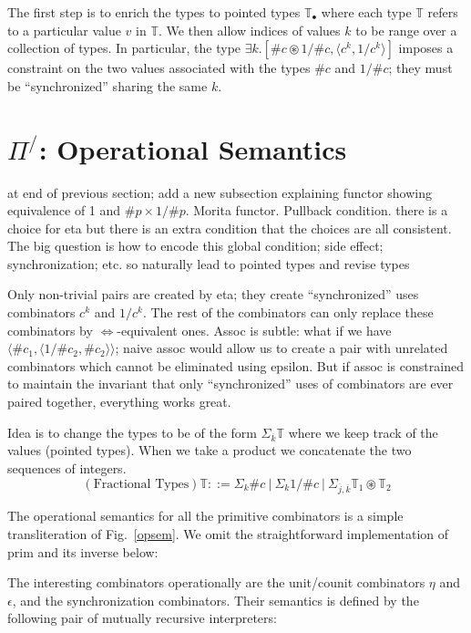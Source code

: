 \documentclass[a4paper,USenglish]{lipics-v2016-utf8x}
\newcommand{\hash}{\#}
\newcommand{\isotwo}{\Leftrightarrow}
\newcommand{\alt}{~|~}
\newcommand{\order}[1]{\hash #1}
\newcommand{\iorder}[1]{1/\hash #1}
\begin{document}
The first step is to enrich the types to pointed types $\mathbb{T_\bullet}$
where each type $\mathbb{T}$ refers to a particular value $v$ in
$\mathbb{T}$. We then allow indices of values $k$ to be range over a collection
of types. In particular, the type
$\exists k.[\order{c} \circledast \iorder{c}, \langle c^k, 1/c^k \rangle]$
imposes a constraint on the two values associated with the types $\order{c}$ and
$\iorder{c}$; they must be ``synchronized'' sharing the same $k$.

\section{$\Pi^/$: Operational Semantics}

at end of previous section; add a new subsection explaining functor showing
equivalence of 1 and $\order{p} \times \iorder{p}$. Morita functor. Pullback condition. there is a
choice for eta but there is an extra condition that the choices are all
consistent. The big question is how to encode this global condition; side
effect; synchronization; etc. so naturally lead to pointed types and revise types

Only non-trivial pairs are created by eta; they create ``synchronized'' uses combinators $c^k$ and $1/c^k$. The rest of the combinators can only replace these combinators by $\isotwo$-equivalent ones. Assoc is subtle: what if we have $\langle \order{c_1} , \langle \iorder{c_2} , \order{c_2} \rangle \rangle$; naive assoc would allow us to create a pair with unrelated combinators which cannot be eliminated using epsilon. But if assoc is constrained to maintain the invariant that only ``synchronized'' uses of combinators are ever paired together, everything works great.

Idea is to change the types to be of the form $\Sigma_{\overline{k}}\mathbb{T}$
where we keep track of the values (pointed types). When we take a product we
concatenate the two sequences of integers.
\[
(\textrm{Fractional Types})  \mathbb{T} ::=
  \Sigma_k\order{c} \alt \Sigma_k\iorder{c} \alt
  \Sigma_{\overline{j},\overline{k}}\mathbb{T}_1 \circledast \mathbb{T}_2
\]

The operational semantics for all the primitive combinators is a
simple transliteration of Fig.~\ref{opsem}. We omit the
straightforward implementation of prim and its inverse
below:

The interesting combinators operationally are the unit/counit combinators $\eta$
and $\epsilon$, and the synchronization combinators. Their semantics is defined
by the following pair of mutually recursive interpreters:
\end{document}

